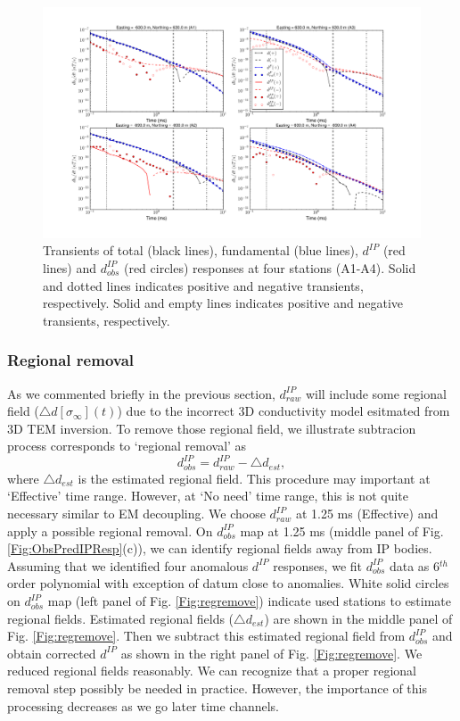 \documentclass[letterpaper,11pt]{article}
\newcommand{\siginf}{\sigma_\infty}
\newcommand{\dip}{d^{IP}}
\begin{document}
\begin{figure}[htb]
  \centering
  \includegraphics[width=1.0\textwidth]{figures/EMcurves.png}
  \caption{Transients of total (black lines), fundamental (blue lines), $\dip$ (red lines) and $\dip_{obs}$ (red circles) responses at four stations (A1-A4). Solid and dotted lines indicates positive and negative transients, respectively. Solid and empty lines indicates positive and negative transients, respectively.}
  \label{Fig:transientsall}
\end{figure}
\clearpage
\subsubsection{Regional removal}
As we commented briefly in the previous section, $\dip_{raw}$ will include some regional field  ($\triangle d[\siginf](t)$) due to the incorrect 3D conductivity model esitmated from 3D TEM inversion. To remove those regional field, we illustrate subtracion process corresponds to `regional removal' as
\begin{equation}
  \dip_{obs} = \dip_{raw}-\triangle d_{est},
\end{equation}
where $\triangle d_{est}$ is the estimated regional field. This procedure may important at `Effective' time range. However, at `No need' time range, this is not quite necessary similar to EM decoupling. We choose $\dip_{raw}$ at 1.25 ms (Effective) and apply a possible regional removal. 
On $\dip_{obs}$ map at 1.25 ms (middle panel of Fig. \ref{Fig:ObsPredIPResp}(c)), we can identify regional fields away from IP bodies. Assuming that we identified four anomalous $\dip$ responses, we fit $\dip_{obs}$ data as 6$^{th}$ order polynomial with exception of datum close to anomalies. White solid circles on $\dip_{obs}$ map (left panel of Fig. \ref{Fig:regremove}) indicate used stations to estimate regional fields. Estimated regional fields ($\triangle d_{est}$) are shown in the middle panel of Fig. \ref{Fig:regremove}. Then we subtract this estimated regional field from $\dip_{obs}$ and obtain corrected $\dip$ as shown in the right panel of Fig. \ref{Fig:regremove}. We reduced regional fields reasonably. We can recognize that a proper regional removal step possibly be needed in practice. However, the importance of this processing decreases as we go later time channels.
\end{document}
